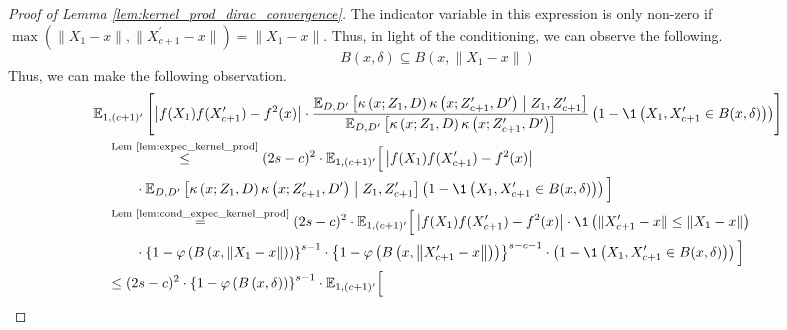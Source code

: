 \begin{proof}[Proof of Lemma \ref{lem:kernel_prod_dirac_convergence}]
    The indicator variable in this expression is only non-zero if $\max\left(\|X_{1} - x\|, \|X_{c+1}^{\prime} - x\|\right) = \|X_{1} - x\|$.
    Thus, in light of the conditioning, we can observe the following.
    \begin{equation}
        B(x, \delta) \subseteq B(x, \|X_{1} - x\|)
    \end{equation}
    Thus, we can make the following observation.
    \begin{equation}
        \begin{aligned}
            & \E_{1, (c+1)^{\prime}}\left[
                \left| f(X_{1}) f(X_{c+1}^{\prime}) - f^{2}(x)\right|
                \cdot \frac{\E_{D, D^{\prime}}\left[\kappa\left(x; Z_{1}, D\right)\kappa\left(x; Z_{c+1}^{\prime}, D^{\prime}\right) \; \middle| \; Z_{1}, Z_{c+1}^{\prime}\right]}{\E_{D, D^{\prime}}\left[\kappa\left(x; Z_{1}, D\right)\kappa\left(x; Z_{c+1}^{\prime}, D^{\prime}\right)\right]}
                \left(1 - \1\left(X_1, X_{c+1}^{\prime} \in B(x, \delta)\right)\right)
            \right]\\
            & \quad \overset{\text{Lem \ref{lem:expec_kernel_prod}}}{\leq}
            (2s-c)^{2} \cdot \E_{1, (c+1)^{\prime}}\Big[
                \left| f(X_{1}) f(X_{c+1}^{\prime}) - f^{2}(x)\right|  \\
                & \quad \quad \quad \cdot \E_{D, D^{\prime}}\left[\kappa\left(x; Z_{1}, D\right)\kappa\left(x; Z_{c+1}^{\prime}, D^{\prime}\right) \; \middle| \; Z_{1}, Z_{c+1}^{\prime}\right]
                \left(1 - \1\left(X_1, X_{c+1}^{\prime} \in B(x, \delta)\right)\right)
            \Big]\\
            & \quad \overset{\text{Lem \ref{lem:cond_expec_kernel_prod}}}{=} 
            (2s-c)^{2} \cdot \E_{1, (c+1)^{\prime}}\Big[
                \left| f(X_{1}) f(X_{c+1}^{\prime}) - f^{2}(x)\right|  
                 \cdot \1\left(\|X_{c+1}^{\prime} - x\| \leq \|X_{1} - x\|\right) \\
            & \quad \quad \quad \cdot \left\{1-\varphi\left(B\left(x,\left\|X_1-x\right\|\right)\right)\right\}^{s-1}
            \cdot \left\{1-\varphi\left(B\left(x,\left\|X_{c+1}^{\prime}-x\right\|\right)\right)\right\}^{s-c-1}
                \cdot \left(1 - \1\left(X_1, X_{c+1}^{\prime} \in B(x, \delta)\right)\right)
            \Big]\\
            & \quad \leq 
            (2s-c)^{2} \cdot \left\{1-\varphi\left(B\left(x, \delta \right)\right)\right\}^{s-1} \cdot \E_{1, (c+1)^{\prime}}\Big[

\end{aligned}
\end{equation}
\end{proof}
